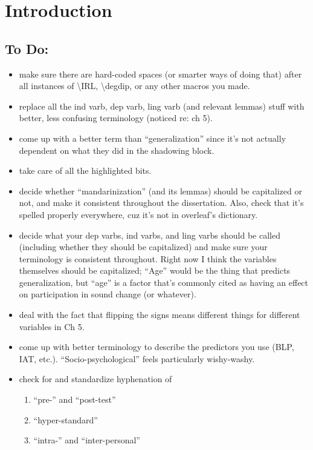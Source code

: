 \chapter{Introduction}
\label{introchap}
\section{To Do:}
\begin{itemize}
    \item make sure there are hard-coded spaces (or smarter ways of doing that) after all instances of \textbackslash IRL, \textbackslash degdip, or any other macros you made.
    \item replace all the ind varb, dep varb, ling varb (and relevant lemmas) stuff with better, less confusing terminology (noticed re: ch 5).
    \item come up with a better term than ``generalization'' since it's not actually dependent on what they did in the shadowing block.
    \item take care of all the highlighted bits.
    \item decide whether ``mandarinization'' (and its lemmas) should be capitalized or not, and make it consistent throughout the dissertation. Also, check that it's spelled properly everywhere, cuz it's not in overleaf's dictionary.
    \item decide what your dep varbs, ind varbs, and ling varbs should be called (including whether they should be capitalized) and make sure your terminology is consistent throughout. Right now I think the variables themselves should be capitalized; ``Age'' would be the thing that predicts generalization, but ``age'' is a factor that's commonly cited as having an effect on participation in sound change (or whatever).
    \item deal with the fact that flipping the signs means different things for different variables in Ch 5.
    \item come up with better terminology to describe the predictors you use (BLP, IAT, etc.). ``Socio-psychological'' feels particularly wishy-washy.
    \item check for and standardize hyphenation of\begin{enumerate}
        \item ``pre-'' and ``post-test''
        \item ``hyper-standard''
        \item ``intra-'' and ``inter-personal''
    \end{enumerate}
\end{itemize}

